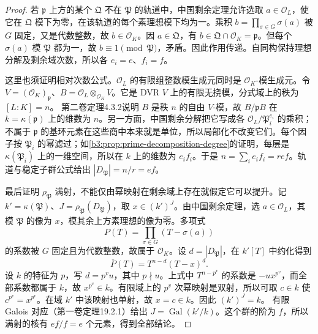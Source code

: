 \begin{proof}
	若 \(\mathfrak p\) 上方的某个 \(\mathfrak Q\) 不在 \(\mathfrak P\) 的轨道中，中国剩余定理允许选取 \(a\in\mathcal O_L\)，使它在 \(\mathfrak Q\) 模下为零，在该轨道的每个素理想模下均为一。乘积 \(b=\prod_{\sigma\in G}\sigma(a)\) 被 \(G\) 固定，又是代数整数，故 \(b\in\mathcal O_K\)。因 \(a\in\mathfrak Q\)，有 \(b\in\mathfrak Q\cap\mathcal O_K=\mathfrak p\)。但每个 \(\sigma(a)\) 模 \(\mathfrak P\) 都为一，故 \(b\equiv1\pmod{\mathfrak P}\)，矛盾。因此作用传递。自同构保持理想分解及剩余域次数，所以各 \(e_i=e\)、\(f_i=f\)。

	这里也须证明相对次数公式。\(\mathcal O_L\) 的有限组整数模生成元同时是 \(\mathcal O_K\)-模生成元。令 \(V=(\mathcal O_K)_{\mathfrak p}\)、\(B=\mathcal O_L\otimes_{\mathcal O_K}V\)。它是 DVR \(V\) 上的有限无挠模，分式域上的秩为 \([L:K]=n\)。
	第二卷定理4.3.2说明 \(B\) 是秩 \(n\) 的自由 \(V\)-模，故 \(B/\mathfrak pB\) 在 \(k=\kappa(\mathfrak p)\) 上的维数为 \(n\)。另一方面，中国剩余分解把它写成各 \(\mathcal O_L/\mathfrak P_i^{e_i}\) 的乘积；不属于 \(\mathfrak p\) 的基环元素在这些商中本来就是单位，所以局部化不改变它们。每个因子按 \(\mathfrak P_i\) 的幂滤过；如\cref{b3:prop:prime-decomposition-degree}的证明，每层是 \(\kappa(\mathfrak P_i)\) 上的一维空间，所以在 \(k\) 上的维数为 \(e_if_i\)。于是 \(n=\sum_i e_if_i=ref\)。轨道与稳定子群公式给出 \(|D_{\mathfrak P}|=n/r=ef\)。

	最后证明 \(\rho_{\mathfrak P}\) 满射，不能仅由幂映射在剩余域上存在就假定它可以提升。记 \(k'=\kappa(\mathfrak P)\)、\(J=\rho_{\mathfrak P}(D_{\mathfrak P})\)，取 \(x\in(k')^J\)。由中国剩余定理，选 \(a\in\mathcal O_L\)，其模 \(\mathfrak P\) 的像为 \(x\)，模其余上方素理想的像为零。多项式
	\[
		P(T)=\prod_{\sigma\in G}(T-\sigma(a))
	\]
	的系数被 \(G\) 固定且为代数整数，故属于 \(\mathcal O_K\)。设 \(d=|D_{\mathfrak P}|\)，在 \(k'[T]\) 中约化得到
	\[
		\overline P(T)=T^{n-d}(T-x)^d.
	\]
	设 \(k\) 的特征为 \(p\)，写 \(d=p^vu\)，其中 \(p\nmid u\)。上式中 \(T^{n-p^v}\) 的系数是 \(-u x^{p^v}\)，而全部系数都属于 \(k\)，故 \(x^{p^v}\in k\)。有限域上的 \(p^v\) 次幂映射是双射，所以可取 \(c\in k\) 使 \(c^{p^v}=x^{p^v}\)。在域 \(k'\) 中该映射也单射，故 \(x=c\in k\)。因此 \((k')^J=k\)。
	有限 Galois 对应（第一卷定理19.2.1）给出 \(J=\operatorname{Gal}(k'/k)\)。这个群的阶为 \(f\)，所以满射的核有 \(ef/f=e\) 个元素，得到全部结论。
\end{proof}

